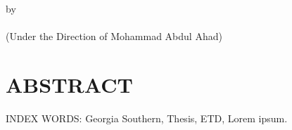 \begin{center}
    \MyTitle \\
    by\\
    \MyAuthor \\
    (Under the Direction of Mohammad Abdul Ahad)
\end{center}


\begingroup
\renewcommand{\clearpage}{}
\singlespacing


\chapter*{ABSTRACT}

\noindent
\lipsum[1-1] 


\noindent
INDEX WORDS: Georgia Southern, Thesis, ETD, Lorem ipsum.

\thispagestyle{empty}
\endgroup



